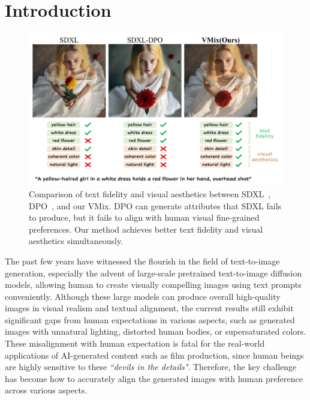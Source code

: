 \section{Introduction}
\label{sec:intro}
\begin{figure}[h]
\centering
\includegraphics[scale=0.48]{aes_dpo_vmix_compare.pdf}
    \caption{Comparison of text fidelity and visual aesthetics between SDXL~\cite{podell2023sdxl}, DPO~\cite{wallace2024diffusion}, and our VMix. DPO can generate attributes that SDXL fails to produce, but it fails to align with human visual fine-grained preferences. Our method achieves better text fidelity and visual aesthetics simultaneously.}
    \label{Figure 0}
\end{figure}
The past few years have witnessed the flourish in the field of text-to-image generation, especially the advent of large-scale pretrained text-to-image diffusion models\cite{rombach2022high,nichol2021glide,ramesh2022hierarchical,feng2023ernie,podell2023sdxl}, allowing human to create visually compelling images using text prompts conveniently.
Although these large models can produce overall high-quality images in visual realism and textual alignment, the current results still exhibit significant gaps from human expectations in various aspects, such as generated images with unnatural lighting, distorted human bodies, or supersaturated colors.
These misalignment with human expectation is fatal for the real-world applications of AI-generated content such as film production, since human beings are highly sensitive to these \emph{``devils in the details"}.
Therefore, the key challenge has become how to accurately align the generated images with human preference across various aspects.

